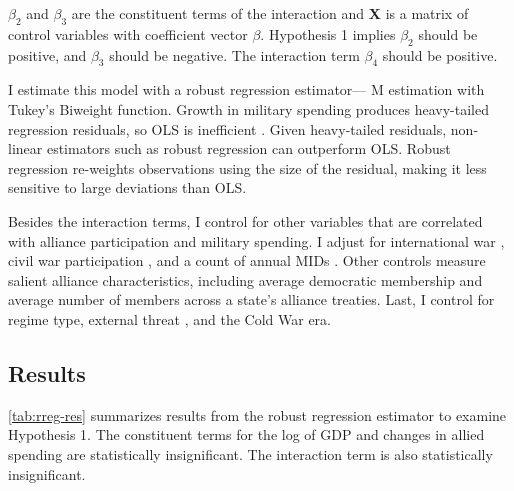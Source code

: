 \documentclass[12pt]{article}
\begin{document}
$\beta_2$ and $\beta_3$ are the constituent terms of the interaction and \textbf{X} is a matrix of control variables with coefficient vector $\beta$.
Hypothesis 1 implies $\beta_2$ should be positive, and $\beta_3$ should be negative. 
The interaction term $\beta_4$ should be positive. 


I estimate this model with a robust regression estimator--- M estimation with Tukey's Biweight function. 
Growth in military spending produces heavy-tailed regression residuals, so OLS is inefficient \citep{RaineyBaissa2018}. 
Given heavy-tailed residuals, non-linear estimators such as robust regression can outperform OLS. 
Robust regression re-weights observations using the size of the residual, making it less sensitive to large deviations than OLS. 


Besides the interaction terms, I control for other variables that are correlated with alliance participation and military spending. 
I adjust for international war \citep{Reiteretal2016}, civil war participation \citep{SarkeesWayman2010}, and a count of annual MIDs \citep{Gibleretal2016}. 
Other controls measure salient alliance characteristics, including average democratic membership \citep{DigiuseppePoast2016} and average number of members across a state's alliance treaties.   
Last, I control for regime type, external threat \citep{LeedsSavun2007}, and the Cold War era. 


\subsection{Results}

 
\autoref{tab:rreg-res} summarizes results from the robust regression estimator to examine Hypothesis 1. 
The constituent terms for the log of GDP and changes in allied spending are statistically insignificant. 
The interaction term is also statistically insignificant. 
\end{document}
